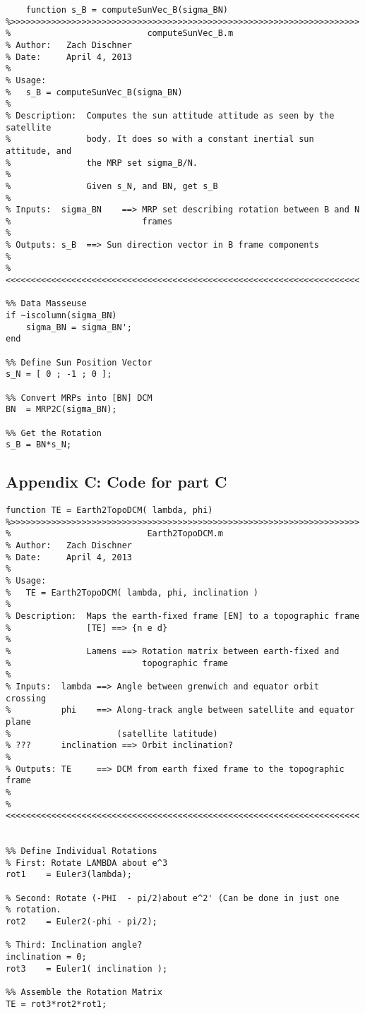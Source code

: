 \documentclass[11pt]{aiaa-tc}%
\begin{document}
\label{APP:Code for Part B}
\begin{lstlisting}
	function s_B = computeSunVec_B(sigma_BN)
%>>>>>>>>>>>>>>>>>>>>>>>>>>>>>>>>>>>>>>>>>>>>>>>>>>>>>>>>>>>>>>>>>>>>> 
%                           computeSunVec_B.m
% Author:   Zach Dischner
% Date:     April 4, 2013
% 
% Usage:
%   s_B = computeSunVec_B(sigma_BN)
%
% Description:  Computes the sun attitude attitude as seen by the satellite 
%               body. It does so with a constant inertial sun attitude, and
%               the MRP set sigma_B/N.
% 
%               Given s_N, and BN, get s_B
% 
% Inputs:  sigma_BN    ==> MRP set describing rotation between B and N
%                          frames
%
% Outputs: s_B  ==> Sun direction vector in B frame components
% 
%<<<<<<<<<<<<<<<<<<<<<<<<<<<<<<<<<<<<<<<<<<<<<<<<<<<<<<<<<<<<<<<<<<<<<<

%% Data Masseuse 
if ~iscolumn(sigma_BN)
    sigma_BN = sigma_BN';
end

%% Define Sun Position Vector
s_N = [ 0 ; -1 ; 0 ];

%% Convert MRPs into [BN] DCM
BN  = MRP2C(sigma_BN);

%% Get the Rotation
s_B = BN*s_N;
\end{lstlisting}


\subsection{Appendix C: Code for part C}

\label{APP:Code for Part C}
\begin{lstlisting}
function TE = Earth2TopoDCM( lambda, phi)
%>>>>>>>>>>>>>>>>>>>>>>>>>>>>>>>>>>>>>>>>>>>>>>>>>>>>>>>>>>>>>>>>>>>>> 
%                           Earth2TopoDCM.m
% Author:   Zach Dischner
% Date:     April 4, 2013
% 
% Usage:
%   TE = Earth2TopoDCM( lambda, phi, inclination )
%
% Description:  Maps the earth-fixed frame [EN] to a topographic frame 
%               [TE] ==> {n e d}
% 
%               Lamens ==> Rotation matrix between earth-fixed and
%                          topographic frame
% 
% Inputs:  lambda ==> Angle between grenwich and equator orbit crossing
%          phi    ==> Along-track angle between satellite and equator plane
%                     (satellite latitude)
% ???      inclination ==> Orbit inclination?
%
% Outputs: TE     ==> DCM from earth fixed frame to the topographic frame
% 
%<<<<<<<<<<<<<<<<<<<<<<<<<<<<<<<<<<<<<<<<<<<<<<<<<<<<<<<<<<<<<<<<<<<<<<


%% Define Individual Rotations
% First: Rotate LAMBDA about e^3
rot1    = Euler3(lambda);

% Second: Rotate (-PHI  - pi/2)about e^2' (Can be done in just one
% rotation.
rot2    = Euler2(-phi - pi/2);

% Third: Inclination angle? 
inclination = 0;
rot3    = Euler1( inclination );

%% Assemble the Rotation Matrix
TE = rot3*rot2*rot1;
\end{lstlisting}
\end{document}
